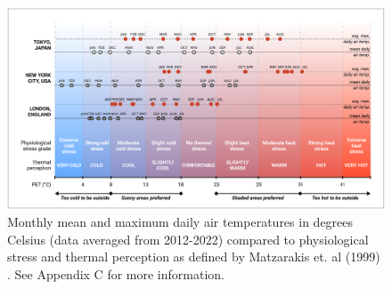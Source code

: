 \begin{figure}[H]
  \centering
  \includegraphics[width=1.0\textwidth]{images/gatherings/temperature.png}
  \caption[Average temperatures by month]{Monthly mean and maximum daily air temperatures in degrees Celsius (data averaged from 2012-2022) compared to physiological stress and thermal perception as defined by Matzarakis et. al (1999) \cite{matzarakis_applications_1999}. See Appendix C for more information.}
  \label{fig:temperature}
\end{figure}


